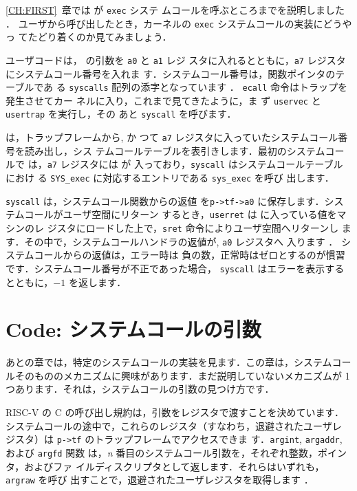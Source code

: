 \ref{CH:FIRST}~章では  が \texttt{exec} システ
ムコールを呼ぶところまでを説明しました
．
ユーザから呼び出したとき，カーネルの \texttt{exec} システムコールの実装にどうやっ
てたどり着くのか見てみましょう．

ユーザコードは， の引数を \texttt{a0} と \texttt{a1} レジ
スタに入れるとともに，\texttt{a7} レジスタにシステムコール番号を入れま
す．システムコール番号は，関数ポインタのテーブルであ
る \texttt{syscalls} 配列の添字となっています
．
\lstinline{ecall} 命令はトラップを発生させてカー
ネルに入り，これまで見てきたように，ま
ず \texttt{uservec} と \texttt{usertrap} を実行し，その
あと \texttt{syscall} を呼びます．

は，トラップフレームから, か
つて \texttt{a7} レジスタに入っていたシステムコール番号を読み出し，シス
テムコールテーブルを表引きします．最初のシステムコールで
は，\texttt{a7} レジスタには  
 が
入っており，\texttt{syscall} はシステムコールテーブルにおけ
る \lstinline{SYS_exec} に対応するエントリである \lstinline{sys_exec} を呼び
出します．

\lstinline{syscall} は，システムコール関数からの返値
を\lstinline{p->tf->a0} に保存します．システムコールがユーザ空間にリターン
するとき，\lstinline{userret} は  に入っている値をマシンのレ
ジスタにロードした上で，\lstinline{sret} 命令によりユーザ空間へリターンし
ます．その中で，システムコールハンドラの返値が, \lstinline{a0} レジスタへ
入ります
．
システムコールからの返値は，エラー時は
負の数，正常時はゼロとするのが慣習です．システムコール番号が不正であった場合，
\lstinline{syscall} はエラーを表示するとともに，$-1$ を返します．


\section{Code: システムコールの引数}

あとの章では，特定のシステムコールの実装を見ます．この章は，システムコー
ルそのもののメカニズムに興味があります．まだ説明していないメカニズムが
1つあります．それは，システムコールの引数の見つけ方です．

RISC-V の C の呼び出し規約は，引数をレジスタで渡すことを決めています．
システムコールの途中で，これらのレジスタ（すなわち，退避されたユーザレ
ジスタ）は \texttt{p->tf} のトラップフレームでアクセスできま
す．\lstinline{argint}, \lstinline{argaddr}, および \lstinline{argfd} 関数
は，\textit{n} 番目のシステムコール引数を，それぞれ整数，ポインタ，およびファ
イルディスクリプタとして返します．それらはいずれも，\texttt{argraw} を呼び
出すことで，退避されたユーザレジスタを取得します
．

